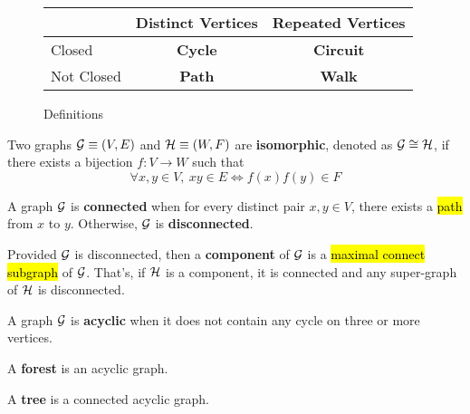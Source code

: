 \documentclass{article}
\begin{document}
		\begin{figure}[h]
			\centering
			\begin{tabular}{l|c|c}
				& Distinct Vertices & Repeated Vertices \\
				\hline
				Closed & \textbf{Cycle} & \textbf{Circuit} \\
				\hline
				Not Closed & \textbf{Path} & \textbf{Walk}
			\end{tabular}
			\caption{Definitions}
		\end{figure}
		
		\begin{definition}
			Two graphs $\mathcal{{G}} \equiv (V, E)$ and $\mathcal{{H}} \equiv (W, F)$ are \textbf{isomorphic}, denoted as $\mathcal{{G}} \cong \mathcal{{H}}$, if there exists a bijection $f: V \to W$ such that
			\begin{equation}
				\forall x, y \in V,\ xy \in E \iff f(x)f(y) \in F
			\end{equation}
		\end{definition}
		
		\begin{definition}
			A graph $\mathcal{{G}}$ is \textbf{connected} when for every distinct pair $x, y \in V$, there exists a \hl{path} from $x$ to $y$. Otherwise, $\mathcal{{G}}$ is \textbf{disconnected}.
		\end{definition}
		
		\begin{definition}
			Provided $\mathcal{{G}}$ is disconnected, then a \textbf{component} of $\mathcal{{G}}$ is a \hl{maximal connect subgraph} of $\mathcal{{G}}$. That's, if $\mathcal{{H}}$ is a component, it is connected and any super-graph of $\mathcal{{H}}$ is disconnected.
		\end{definition}
		
		\begin{definition}
			A graph $\mathcal{{G}}$ is \textbf{acyclic} when it does not contain any cycle on three or more vertices. 
		\end{definition}
		
		\begin{definition}
			A \textbf{forest} is an acyclic graph.
		\end{definition}
		
		\begin{definition}
			A \textbf{tree} is a connected acyclic graph.
		\end{definition}
		
%		
		
\end{document}
